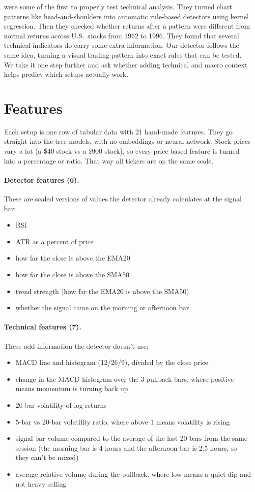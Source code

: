 \citet{lo2000foundations} were some of the first to properly test technical analysis. They turned chart patterns like head-and-shoulders into automatic rule-based detectors using kernel regression. Then they checked whether returns after a pattern were different from normal returns across U.S.\ stocks from 1962 to 1996. They found that several technical indicators do carry some extra information. Our detector follows the same idea, turning a visual trading pattern into exact rules that can be tested. We take it one step further and ask whether adding technical and macro context helps predict which setups actually work.

\section{Features}

Each setup is one row of tabular data with 21 hand-made features. They go straight into the tree models, with no embeddings or neural network. Stock prices vary a lot (a \$40 stock vs a \$900 stock), so every price-based feature is turned into a percentage or ratio. That way all tickers are on the same scale.

\paragraph{Detector features (6).} These are scaled versions of values the detector already calculates at the signal bar:
\begin{itemize}
  \item RSI
  \item ATR as a percent of price
  \item how far the close is above the EMA20
  \item how far the close is above the SMA50
  \item trend strength (how far the EMA20 is above the SMA50)
  \item whether the signal came on the morning or afternoon bar
\end{itemize}

\paragraph{Technical features (7).} These add information the detector doesn't use:
\begin{itemize}
  \item MACD line and histogram (12/26/9), divided by the close price
  \item change in the MACD histogram over the 3 pullback bars, where positive means momentum is turning back up
  \item 20-bar volatility of log returns
  \item 5-bar vs 20-bar volatility ratio, where above 1 means volatility is rising
  \item signal bar volume compared to the average of the last 20 bars from the same session (the morning bar is 4 hours and the afternoon bar is 2.5 hours, so they can't be mixed)
  \item average relative volume during the pullback, where low means a quiet dip and not heavy selling
\end{itemize}

